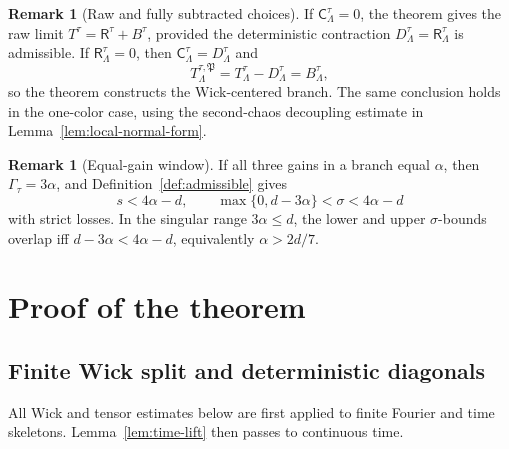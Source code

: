 \documentclass[11pt,reqno]{amsart}
\numberwithin{equation}{section}
\theoremstyle{plain}
\theoremstyle{definition}
\newtheorem{remark}[theorem]{Remark}
\newcommand{\Ret}{\mathsf R}
\newcommand{\Ctr}{\mathsf C}
\begin{document}
\begin{remark}[Raw and fully subtracted choices]\label{rem:raw-wick}
If \(\Ctr^\tau_\Lambda=0\), the theorem gives the raw limit \(T^\tau=\Ret^\tau+B^\tau\), provided the deterministic contraction \(D^\tau_\Lambda=\Ret^\tau_\Lambda\) is admissible.  If \(\Ret^\tau_\Lambda=0\), then \(\Ctr^\tau_\Lambda=D^\tau_\Lambda\) and
\[
        T_{\Lambda}^{\tau,\mathfrak P}=T^\tau_\Lambda-D^\tau_\Lambda=B^\tau_\Lambda,
\]
so the theorem constructs the Wick-centered branch.  The same conclusion
holds in the one-color case, using the second-chaos decoupling estimate in
Lemma~\ref{lem:local-normal-form}.
\end{remark}

\begin{remark}[Equal-gain window]\label{rem:thresholds}
If all three gains in a branch equal \(\alpha\), then \(\Gamma_\tau=3\alpha\), and Definition~\ref{def:admissible} gives
\[
        s<4\alpha-d,
        \qquad
        \max\{0,d-3\alpha\}<\sigma<4\alpha-d
\]
with strict losses.  In the singular range \(3\alpha\le d\), the lower and upper \(\sigma\)-bounds overlap iff \(d-3\alpha<4\alpha-d\), equivalently \(\alpha>2d/7\).
\end{remark}


\section{Proof of the theorem}\label{sec:proof}

\subsection{Finite Wick split and deterministic diagonals}\label{sec:split-diag}

All Wick and tensor estimates below are first applied to finite Fourier and
time skeletons.  Lemma~\ref{lem:time-lift} then passes to continuous time.
\end{document}
